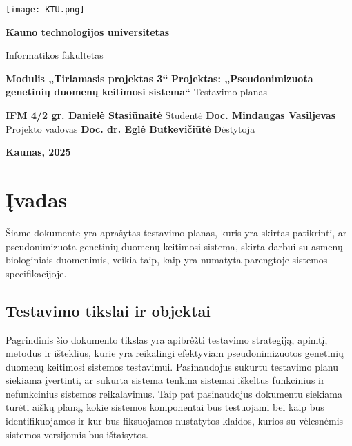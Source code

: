 \documentclass[12pt]{article}
\begin{document}

\begin{titlepage}
\vskip 20pt
\begin{center}
\texttt{[image: KTU.png]}
\end{center}


\vskip 20pt
\centerline{\bf \large \textbf{Kauno technologijos universitetas}}
\bigskip
\centerline{\large {Informatikos fakultetas}}
\bigskip

\vskip 90pt
\begin{center}
    {\bf \LARGE Modulis „Tiriamasis projektas 3“}
    \vskip 10pt
    {\bf \Large Projektas: „Pseudonimizuota genetinių duomenų keitimosi sistema“}
    \vskip 15pt
    {\large Testavimo planas}
\end{center}

\vskip 40pt

\hskip 200pt {\bf \large IFM 4/2 gr. Danielė Stasiūnaitė}
\vskip 1pt
\hskip 200pt {\large Studentė}
\vskip 7pt
\hskip 200pt {\bf \large Doc. Mindaugas Vasiljevas}
\vskip 1pt
\hskip 200pt {\large Projekto vadovas}
\vskip 7pt
\hskip 200pt {\bf \large Doc. dr. Eglė Butkevičiūtė}
\vskip 1pt
\hskip 200pt {\large Dėstytoja}

\bigskip

\vskip 100pt
\centerline{\large \textbf{Kaunas, 2025}}
\newpage
\end{titlepage}



\tableofcontents
\newpage

\section{Įvadas}
Šiame dokumente yra aprašytas testavimo planas, kuris yra skirtas patikrinti, ar
pseudonimizuota genetinių duomenų keitimosi sistema, skirta darbui su asmenų
biologiniais duomenimis, veikia taip, kaip yra numatyta parengtoje sistemos
specifikacijoje.

\subsection{Testavimo tikslai ir objektai}
Pagrindinis šio dokumento tikslas yra apibrėžti testavimo strategiją,
apimtį, metodus ir išteklius, kurie yra reikalingi efektyviam pseudonimizuotos
genetinių duomenų keitimosi sistemos testavimui. Pasinaudojus sukurtu testavimo
planu siekiama įvertinti, ar sukurta sistema tenkina sistemai iškeltus
funkcinius ir nefunkcinius sistemos reikalavimus. Taip pat pasinaudojus
dokumentu siekiama turėti aiškų planą, kokie sistemos komponentai bus testuojami
bei kaip bus identifikuojamos ir kur bus fiksuojamos nustatytos klaidos, kurios
su vėlesnėmis sistemos versijomis bus ištaisytos.
\end{document}
